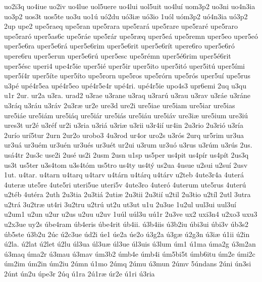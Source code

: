 {uo2i3q
uo4iue
uo2iv
uo4lue
uol5uere
uo4lui
uol5uit
uo4lu^^ed
uom3p2
uo3ni
uo4n3ia
uo3p2
uos3t
uos5te
uo3u
uo1^^fa
u^^f32du
u^^f33i^^e6
u^^f33io
1u^^f3l
u^^f3m3p2
u^^f34n3ia
u^^f33p2
2up
upe2
upe5raeq
upe5ran
upe5rara
upe5rar^^e1
upe5rare
upe5rar^^e9
upe5raro
upe5rar^^f3
uper5as6c
upe5r^^e1e
upe5r^^e1r
upe5r^^e6q
uper5e^^e1
upe5remn
uper5eo
uper5e^^f3
uper5e6ra
uper5e6r^^e1
uper5e6rim
uper5e6rit
uper5e6r^^edt
upere6ro
uper5e6r^^f3
upere6ru
uper5erun
uper5e6r^^fa
uper5esc
upe5r^^e9mn
uper5^^e96rim
uper5^^e96rit
uper5^^e9sc
uperi4
upe4r5ie
uper5i^^e9
uper5ir
uper5ito
uper5it^^f3
uper5it^^fa
uper5^^edmi
uper5^^ed4r
uper5^^edte
uper5^^edto
upe5rorn
upe5ros
upe5r^^f3rn
upe5r^^f3s
uper5u^^ed
upe5rus
u3p^^e9
up^^e94r5ea
up^^e94r5eo
up^^e94r5e4r
up^^e94ri.
up^^e94r5ie
upo4s3
upr6emi
2uq
u3qu
u1r
2ur.
ur2a
u3ra.
urad2
u3rae
u3rane
u3raq
u3rar^^fa
u3rau
u3rav
u3r^^e1e
u3r^^e1ne
u3r^^e1q
u3r^^e1u
u3r^^e1v
2u3r^^e6
ur2e
ure3d
ure2i
ure5iae
ure5iam
ure5iar
ure5ias
ure5i^^e1e
ure5i^^e1m
ure5i^^e1q
ure5i^^e1r
ure5i^^e1s
ure5i^^e1u
ure5i^^e1v
ure3i^^e6
ure5ium
ure3i^^fa
ures3t
ur2^^e9
u3r^^e9f
ur2i
u3ria
u3ri^^e1
u3ri^^e6
u3rii
u3r4i^^ed
ur4in
2u3rio
2u3ri^^f3
u3r^^eda
2ur^^edo
ur^^ed5tur
2urn
2ur2o
urobo3
4u3rod
ur4or
uro2s
u3r^^f3s
2urq
ur5rim
ur3ua
ur3u^^e1
ur3u^^e9m
ur3u^^e9n
ur3u^^e9s
ur3u^^e9t
ur2ui
u3rum
ur3u^^f3
u3rus
u3r^^fam
u3r^^fas
2us.
us^^e14tr
2us3c
use2i
2us^^e9
us2i
2usm
2usn
u1sp
us5per
us4pit
us4p^^edr
us4p^^edt
2us3q
us3t
us5ter
u3s4tom
u3s4t^^f3m
us5tro
us4ty
us4t^^fd
us2ua
4usue
u2sui
u2su^^ed
2usv
1ut.
u4tar.
u4tarn
u4tarq
u4tarv
u4t^^e1rn
u4t^^e1rq
u4t^^e1rv
u2teb
4ute3r4a
4uter^^e1
4uter^^e6
ute5re
4ute5ri
uteri5ue
uteri5v
4ute3ro
4uter^^f3
4uterum
ute5rus
4uter^^fa
u2t^^e9b
4ut^^e9ra
2uth
2u3tia
2u3ti^^e1
2uti^^e6
2u3tii
2u3ti^^ed
u2til
2u3tio
u2t^^edl
2utl
3utra
u2tr^^e1
3u2tr^^e6
ut4ri
3u2tru
u2tr^^fa
ut2u
ut3ut
u1u
2u3ue
1u2ul
uul3ui
uul3u^^ed
u2um1
u2un
u2ur
u2us
u2uu
u2uv
1u^^fal
u^^fal3u
u^^fa1r
2u3ve
ux2
uxi3n4
u2xo3
uxu3
u2x3ue
uy2s
^^fabe4ram
^^fab4eris
^^fabe4rit
^^fab4ii.
^^fa3b4iis
^^fa3b2iu
^^fabi3ui
^^fabi3v
^^fab3s2
^^fab5ste
^^fa3b2u
2^^fac
^^fa2c3ue
^^fad2i
^^fae1
^^fae2a
^^fae2o
^^fa3g2a
^^fa3g^^e6
^^fa2g3n
^^fa3i^^e6
^^fa1ii
^^fa2in
^^fa2la.
^^fa2lat
^^fa2let
^^fa2lu
^^fal3ua
^^fal3u^^e6
^^fal3ue
^^fal3uis
^^fa3lum
^^fam1
^^fa1ma
^^fama2g
^^fa3m2an
^^fa3maq
^^fama2r
^^fa3mau
^^fa3mav
^^fam3b2
^^famb4e
^^famb4i
^^fam5bi5t
^^famb6itu
^^fam2e
^^fami2c
^^fam2im
^^fam2in
^^fam2iu
2^^famn
^^fa1mo
2^^famq
2^^famu
^^fa3mun
2^^famv
5^^fandans
2^^fani
^^fan3si
2^^fant
^^fan2u
^^fape3r
2^^faq
^^fa1ra
2^^fa1r^^e6
^^far2e
^^fa1ri
^^fa3ria
}
